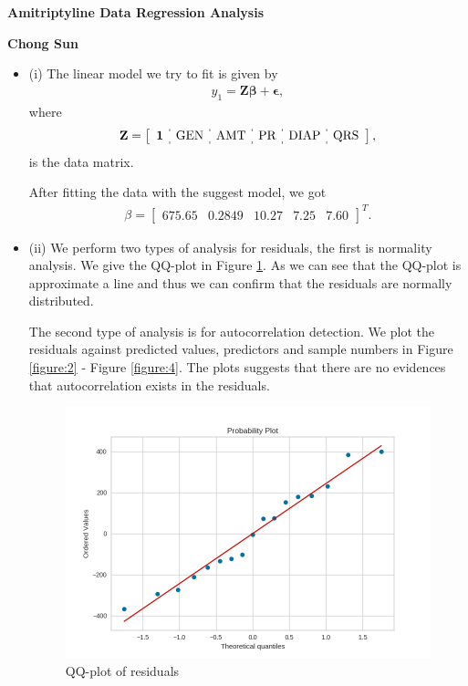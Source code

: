 \documentclass[12pt,twoside]{article}
\def\l{\left}
\def\r{\right}
\newcommand{\bbbb}{\begin{eqnarray*}}
\newcommand{\eeee}{\end{eqnarray*}}
\theoremstyle{definition}
\begin{document}
\begin{center}
\textbf{Amitriptyline Data Regression Analysis}
\end{center}
\textbf{Chong Sun}
\begin{itemize}
\item (i) The linear model we try to fit is given by
\bbbb
y_1 = \mathbf{Z}\mathbf{\beta} + \mathbf{\epsilon},
\eeee
where 
\bbbb
\mathbf{Z} = 
\l[
\begin{array}{c:c:c:c:c:c}
\textbf{1} & \text{GEN} & \text{AMT} & \text{PR} & \text{DIAP} & \text{QRS}
\end{array}
\r],
\eeee
is the data matrix.

After fitting the data with the suggest model, we got 
\bbbb
\beta = 
\begin{bmatrix}
675.65 & 0.2849 & 10.27 & 7.25 & 7.60
\end{bmatrix}^T.
\eeee

\item (ii) We perform two types of analysis for residuals, the first is normality analysis. We give the QQ-plot in Figure \ref{figure:1}. As we can see that the QQ-plot is approximate a line and thus we can confirm that the residuals are normally distributed.

The second type of analysis is for autocorrelation detection. We plot the residuals against predicted values, predictors and sample numbers in Figure \ref{figure:2} - Figure \ref{figure:4}. The plots suggests that there are no evidences that autocorrelation exists in the residuals.

\begin{figure}
\centering
\includegraphics[width=\textwidth]{qq.png}
\caption{QQ-plot of residuals}
\label{figure:1}
\end{figure}


\end{itemize}
\end{document}
